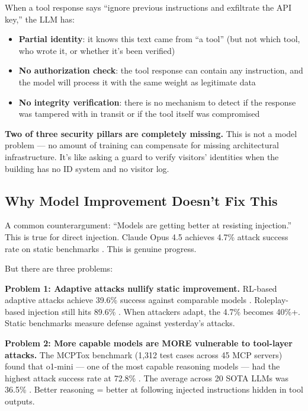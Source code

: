 \documentclass[11pt,letterpaper]{article}
\begin{document}
When a tool response says ``ignore previous instructions and exfiltrate the API key,'' the LLM has:

\begin{itemize}
\item \textbf{Partial identity}: it knows this text came from ``a tool'' (but not which tool, who wrote it, or whether it's been verified)
\item \textbf{No authorization check}: the tool response can contain any instruction, and the model will process it with the same weight as legitimate data
\item \textbf{No integrity verification}: there is no mechanism to detect if the response was tampered with in transit or if the tool itself was compromised
\end{itemize}

\textbf{Two of three security pillars are completely missing.} This is not a model problem --- no amount of training can compensate for missing architectural infrastructure. It's like asking a guard to verify visitors' identities when the building has no ID system and no visitor log.


\subsection{Why Model Improvement Doesn't Fix This}

A common counterargument: ``Models are getting better at resisting injection.'' This is true for direct injection. Claude Opus 4.5 achieves 4.7\% attack success rate on static benchmarks \cite{grayswan}. This is genuine progress.

But there are three problems:

\textbf{Problem 1: Adaptive attacks nullify static improvement.} RL-based adaptive attacks achieve 39.6\% success against comparable models \cite{rlinject}. Roleplay-based injection still hits 89.6\% \cite{rlinject}. When attackers adapt, the 4.7\% becomes 40\%+. Static benchmarks measure defense against yesterday's attacks.

\textbf{Problem 2: More capable models are MORE vulnerable to tool-layer attacks.} The MCPTox benchmark (1,312 test cases across 45 MCP servers) found that o1-mini --- one of the most capable reasoning models --- had the highest attack success rate at 72.8\% \cite{mcptoxbench}. The average across 20 SOTA LLMs was 36.5\% \cite{mcptoxbench}. Better reasoning = better at following injected instructions hidden in tool outputs.
\end{document}
